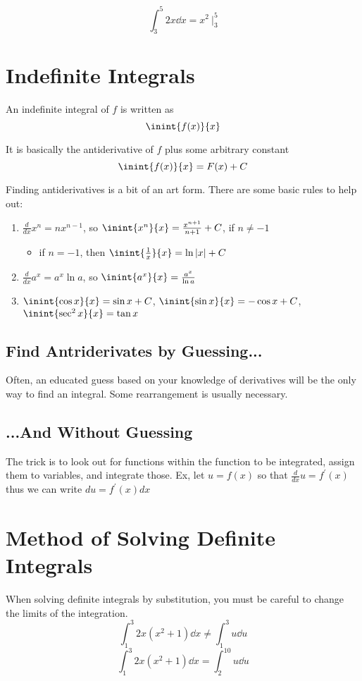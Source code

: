 \documentclass[12pt]{article}
\begin{document}
\[ \int_3^5 2x \dd x = x^2\ \bigg|_3^5 \]

\section*{Indefinite Integrals}
An indefinite integral of $f$ is written as \[ \inint{f(x)}{x} \]

It is basically the antiderivative of $f$ plus some arbitrary constant \[ \inint{f(x)}{x} = F(x) +C \]

Finding antiderivatives is a bit of an art form. There are some basic rules to help out:
\begin{enumerate}
\item $\frac{d}{dx}x^n = nx^{n-1}$, so $\inint{x^n}{x} = \frac{x^{n+1}}{n+1} + C$, if $n\neq -1$
\begin{itemize}
\item if $n=-1$, then $\inint{\frac{1}{x}}{x} = \ln{|x|} + C$
\end{itemize}
\item $\frac{d}{dx}a^x = a^x\ln{a}$, so $\inint{a^x}{x} = \frac{a^x}{\ln{a}}$
\item $\inint{\cos x}{x} = \sin x + C$, $\inint{\sin x}{x} = -\cos x + C$, $\inint{\sec^2 x}{x} = \tan x$
\end{enumerate}

\subsection*{Find Antriderivates by Guessing...}
Often, an educated guess based on your knowledge of derivatives will be the only way to find an integral. Some rearrangement is usually necessary.

\subsection*{...And Without Guessing}
The trick is to look out for functions within the function to be integrated, assign them to variables, and integrate those. Ex, let $u = f(x)$ so that $\frac{d}{dx}u = f^\prime(x)$ thus we can write $du = f^\prime(x)dx$

\section*{Method of Solving Definite Integrals}
When solving definite integrals by substitution, you must be careful to change the limits of the integration. \[ \int_1^3 2x(x^2+1) \dd x \neq \int_1^3 u \dd u \] \[ \int_1^3 2x(x^2+1) \dd x = \int_2^{10} u \dd u \]
\end{document}
